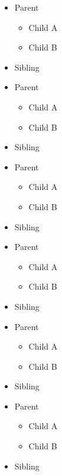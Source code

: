\begin{itemize}
\item Parent
\begin{itemize}
\item Child A
\item Child B
\end{itemize}
\item Sibling
\end{itemize}
\begin{itemize}
\item Parent
\begin{itemize}
\item Child A
\item Child B
\end{itemize}
\item Sibling
\end{itemize}
\begin{itemize}
\item Parent
\begin{itemize}
\item Child A
\item Child B
\end{itemize}
\item Sibling
\end{itemize}
\begin{frame}[t]
\begin{itemize}
\item Parent
\begin{itemize}
\item Child A
\item Child B
\end{itemize}
\item Sibling
\end{itemize}
\end{frame}

\begin{frame}[t]
\begin{itemize}
\item Parent
\begin{itemize}
\item Child A
\item Child B
\end{itemize}
\item Sibling
\end{itemize}
\end{frame}

\begin{frame}[t]
\begin{itemize}
\item Parent
\begin{itemize}
\item Child A
\item Child B
\end{itemize}
\item Sibling
\end{itemize}
\end{frame}

